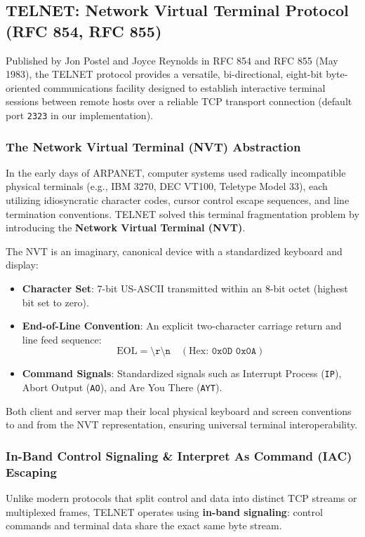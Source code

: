 \documentclass[12pt, a4paper]{article}
\begin{document}
\subsection{TELNET: Network Virtual Terminal Protocol (RFC 854, RFC 855)}
Published by Jon Postel and Joyce Reynolds in RFC 854 and RFC 855 (May 1983), the TELNET protocol provides a versatile, bi-directional, eight-bit byte-oriented communications facility designed to establish interactive terminal sessions between remote hosts over a reliable TCP transport connection (default port \texttt{2323} in our implementation).

\subsubsection{The Network Virtual Terminal (NVT) Abstraction}
In the early days of ARPANET, computer systems used radically incompatible physical terminals (e.g., IBM 3270, DEC VT100, Teletype Model 33), each utilizing idiosyncratic character codes, cursor control escape sequences, and line termination conventions. TELNET solved this terminal fragmentation problem by introducing the \textbf{Network Virtual Terminal (NVT)}.

The NVT is an imaginary, canonical device with a standardized keyboard and display:
\begin{itemize}
    \item \textbf{Character Set}: 7-bit US-ASCII transmitted within an 8-bit octet (highest bit set to zero).
    \item \textbf{End-of-Line Convention}: An explicit two-character carriage return and line feed sequence:
    \begin{equation}
        \text{EOL} = \texttt{\textbackslash r\textbackslash n} \quad (\text{Hex: } \texttt{0x0D 0x0A})
    \end{equation}
    \item \textbf{Command Signals}: Standardized signals such as Interrupt Process (\texttt{IP}), Abort Output (\texttt{AO}), and Are You There (\texttt{AYT}).
\end{itemize}
Both client and server map their local physical keyboard and screen conventions to and from the NVT representation, ensuring universal terminal interoperability.

\subsubsection{In-Band Control Signaling \& Interpret As Command (IAC) Escaping}
Unlike modern protocols that split control and data into distinct TCP streams or multiplexed frames, TELNET operates using \textbf{in-band signaling}: control commands and terminal data share the exact same byte stream.
\end{document}
